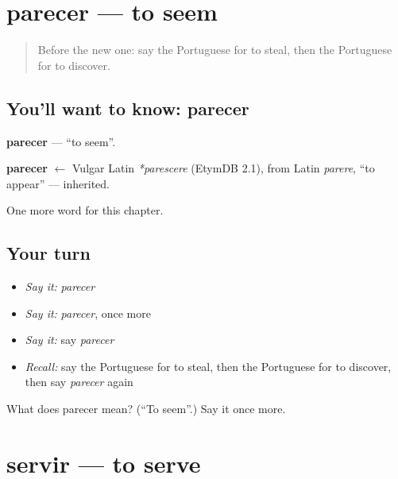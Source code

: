 \section[parecer]{parecer — to seem}

\label{lesson:PT-C206-parecer}



\begin{quote}
Before the new one: say the Portuguese for to steal, then the Portuguese for to discover.
\end{quote}

\subsection*{You'll want to know: parecer}
\textbf{parecer} — \textquotedblleft{}to seem\textquotedblright{}.

\begin{cousinweb}
\textbf{parecer} $\leftarrow$ Vulgar Latin \emph{*parescere} (EtymDB 2.1), from Latin \emph{parere}, \textquotedblleft{}to appear\textquotedblright{} — inherited.
\end{cousinweb}

\begin{grammarlens}[title={What you've built}]
One more word for this chapter.
\end{grammarlens}

\subsection*{Your turn}
\begin{itemize}
\raggedright
  \item \emph{Say it:} \emph{parecer}
  \item \emph{Say it:} \emph{parecer}, once more
  \item \emph{Say it:} say \emph{parecer}
  \item \emph{Recall:} say the Portuguese for to steal, then the Portuguese for to discover, then say \emph{parecer} again
\end{itemize}

\begin{tcolorbox}[breakable,colback=teal!4,colframe=teal!35!black,title={Before you move on}]
What does parecer mean? (\textquotedblleft{}To seem\textquotedblright{}.) Say it once more.
\end{tcolorbox}
\section[servir]{servir — to serve}

